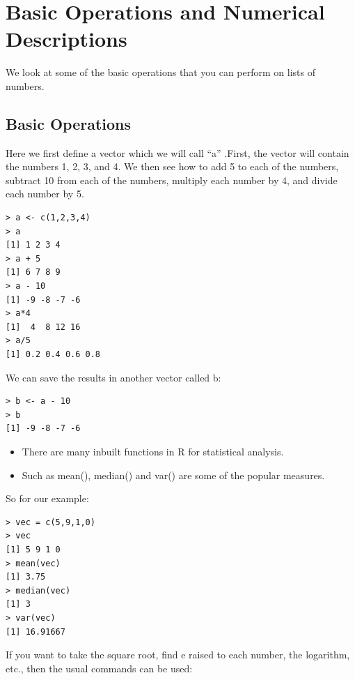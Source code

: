 \clearpage

\section{Basic Operations and Numerical Descriptions}

We look at some of the basic operations that you can perform on lists of numbers. \newline

\subsection{Basic Operations}

Here we first define a vector which we will call “a” .First, the vector will contain the numbers 1, 2, 3, and 4. We then see how to add 5 to each of the numbers, subtract 10 from each of the numbers, multiply each number by 4, and divide each number by 5. \newline

\begin{lstlisting}[frame=single]
> a <- c(1,2,3,4)
> a
[1] 1 2 3 4
> a + 5
[1] 6 7 8 9
> a - 10
[1] -9 -8 -7 -6
> a*4
[1]  4  8 12 16
> a/5
[1] 0.2 0.4 0.6 0.8
\end{lstlisting}


We can save the results in another vector called b: \newline

\begin{lstlisting}[frame=single]
> b <- a - 10
> b
[1] -9 -8 -7 -6
\end{lstlisting}

\begin{itemize}
\item There are many inbuilt functions in R for statistical analysis. 
\item Such as mean(), median() and var() are some of the popular measures. 
\end{itemize}

So for our example:

\begin{lstlisting}[frame=single]
> vec = c(5,9,1,0)
> vec
[1] 5 9 1 0
> mean(vec)
[1] 3.75
> median(vec)
[1] 3
> var(vec)
[1] 16.91667
\end{lstlisting}

If you want to take the square root, find e raised to each number, the logarithm, etc., then the usual commands can be used: \newline

